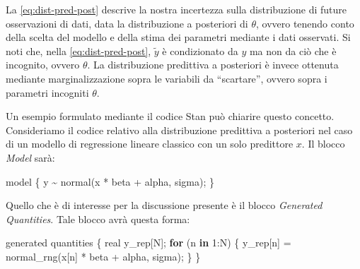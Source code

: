 \documentclass[
  11pt,
]{krantz}
\makeatletter
\newenvironment{Shaded}{\begin{snugshade}}{\end{snugshade}}
\newcommand{\ControlFlowTok}[1]{\textcolor[rgb]{0.27,0.27,0.27}{\textbf{#1}}}
\newcommand{\DecValTok}[1]{\textcolor[rgb]{0.06,0.06,0.06}{#1}}
\newcommand{\FunctionTok}[1]{\textcolor[rgb]{0,0,0}{#1}}
\newcommand{\NormalTok}[1]{#1}
\newcommand{\OtherTok}[1]{\textcolor[rgb]{0.37,0.37,0.37}{#1}}
\newcommand{\SpecialCharTok}[1]{\textcolor[rgb]{0,0,0}{#1}}
\newenvironment{kframe}{%
\medskip{}
\setlength{\fboxsep}{.8em}
 \def\at@end@of@kframe{}%
 \ifinner\ifhmode%
  \def\at@end@of@kframe{\end{minipage}}%
  \begin{minipage}{\columnwidth}%
 \fi\fi%
 \def\FrameCommand##1{\hskip\@totalleftmargin \hskip-\fboxsep
 \colorbox{shadecolor}{##1}\hskip-\fboxsep
     \hskip-\linewidth \hskip-\@totalleftmargin \hskip\columnwidth}%
 \MakeFramed {\advance\hsize-\width
   \@totalleftmargin\z@ \linewidth\hsize
   \@setminipage}}%
 {\par\unskip\endMakeFramed%
 \at@end@of@kframe}
\renewenvironment{Shaded}{\begin{kframe}}{\end{kframe}}
\theoremstyle{definition}
\theoremstyle{definition}
\theoremstyle{definition}
\theoremstyle{definition}
\theoremstyle{remark}
\makeatother
\begin{document}
La \eqref{eq:dist-pred-post} descrive la nostra incertezza sulla distribuzione di future osservazioni di dati, data la distribuzione a posteriori di \(\theta\), ovvero tenendo conto della scelta del modello e della stima dei parametri mediante i dati osservati. Si noti che, nella \eqref{eq:dist-pred-post}, \(\tilde{y}\) è condizionato da \(y\) ma non da ciò che è incognito, ovvero \(\theta\). La distribuzione predittiva a posteriori è invece ottenuta mediante marginalizzazione sopra le variabili da ``scartare'', ovvero sopra i parametri incogniti \(\theta\).

Un esempio formulato mediante il codice Stan può chiarire questo concetto. Consideriamo il codice relativo alla distribuzione predittiva a posteriori nel caso di un modello di regressione lineare classico con un solo predittore \(x\). Il blocco \emph{Model} sarà:

\begin{Shaded}
\begin{Highlighting}[]
\NormalTok{model \{}
\NormalTok{ y }\SpecialCharTok{\textasciitilde{}} \FunctionTok{normal}\NormalTok{(x }\SpecialCharTok{*}\NormalTok{ beta }\SpecialCharTok{+}\NormalTok{ alpha, sigma);}
\NormalTok{\}}
\end{Highlighting}
\end{Shaded}

Quello che è di interesse per la discussione presente è il blocco \emph{Generated Quantities}. Tale blocco avrà questa forma:

\begin{Shaded}
\begin{Highlighting}[]
\NormalTok{generated quantities \{}
\NormalTok{ real y\_rep[N];}
 \ControlFlowTok{for}\NormalTok{ (n }\ControlFlowTok{in} \DecValTok{1}\SpecialCharTok{:}\NormalTok{N) \{}
\NormalTok{   y\_rep[n] }\OtherTok{=} \FunctionTok{normal\_rng}\NormalTok{(x[n] }\SpecialCharTok{*}\NormalTok{ beta }\SpecialCharTok{+}\NormalTok{ alpha, sigma);}
\NormalTok{ \}}
\NormalTok{\}}
\end{Highlighting}
\end{Shaded}
\end{document}
